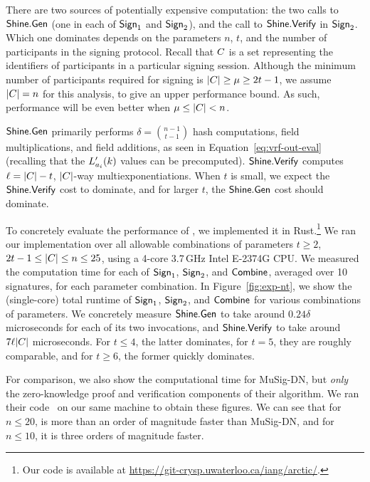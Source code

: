 There are two sources of potentially expensive computation: the two
calls to $\mathsf{Shine}.\mathsf{Gen}$ (one in each of $\mathsf{Sign}_1$ and $\mathsf{Sign}_2$),
and the call to $\mathsf{Shine}.\mathsf{Verify}$ in $\mathsf{Sign}_2$.  Which one dominates
depends on the parameters $n$, $t$, and the number of participants in the signing protocol.
Recall that $C$ is a set representing the identifiers of participants in a particular signing session.
Although the minimum number of participants required for signing is
$\lvert C \rvert \geq \mu \geq 2t-1$,
we assume $\lvert C \rvert = n$ for this analysis,
to give an upper performance bound.
As such, performance will be even better when $\mu \leq \lvert C \rvert < n$.

$\mathsf{Shine}.\mathsf{Gen}$ primarily performs $\delta = {n-1 \choose t-1}$
hash computations, field multiplications, and field additions, as seen
in Equation~\ref{eq:vrf-out-eval} (recalling that the $L'_{a_i}(k)$ values can be precomputed).
$\mathsf{Shine}.\mathsf{Verify}$ computes $\ell=|C|-t$,
$|C|$-way multiexponentiations.  When $t$ is small, we expect
the $\mathsf{Shine}.\mathsf{Verify}$ cost to dominate, and for larger $t$, the
$\mathsf{Shine}.\mathsf{Gen}$ cost should dominate.

To concretely evaluate the performance of \glitter, we implemented it in
Rust.\footnote{Our code is available at
\url{https://git-crysp.uwaterloo.ca/iang/arctic/}.}
We ran our implementation over all allowable combinations of
parameters $t \ge 2$, $2t-1 \le |C| \le n \le 25$, using a
4-core 3.7\,GHz Intel E-2374G CPU.
We measured the computation time for each of $\mathsf{Sign}_1$,
$\mathsf{Sign}_2$, and $\mathsf{Combine}$, averaged over 10 signatures, for each parameter
combination.  In Figure~\ref{fig:exp-nt}, we show the (single-core)
total runtime of $\mathsf{Sign}_1$, $\mathsf{Sign}_2$, and $\mathsf{Combine}$ for various
combinations of parameters.  We concretely measure $\mathsf{Shine}.\mathsf{Gen}$
to take around $0.24 \delta$ microseconds for each of its two
invocations, and $\mathsf{Shine}.\mathsf{Verify}$ to take around $7 \ell
|C|$ microseconds.  For $t \le 4$, the latter dominates, for
$t=5$, they are roughly comparable, and for $t \ge 6$, the former
quickly dominates.

For comparison, we also show the computational time for MuSig-DN, but
\emph{only} the zero-knowledge proof and verification components of
their algorithm.  We ran their code~\cite{musig-dn-code} on our same
machine to obtain these figures.  We can see that for $n\le 20$,
\glitter is more than an order of magnitude faster than MuSig-DN, and
for $n \le 10$, it is three orders of magnitude faster.


